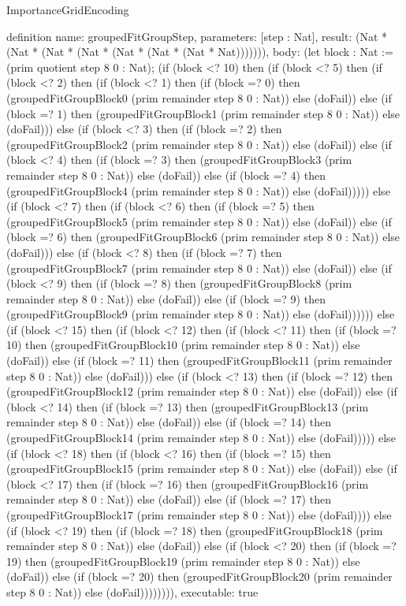 \begin{lexlean}{ImportanceGridEncoding}
\begin{semanticmodule}
definition{
  name: groupedFitGroupStep,
  parameters: [step : Nat],
  result: (Nat * (Nat * (Nat * (Nat * (Nat * (Nat * (Nat * Nat))))))),
  body: (let block : Nat := (prim quotient step 8 0 : Nat); (if (block <? 10) then
      (if (block <? 5) then
      (if (block <? 2) then
      (if (block <? 1) then
      (if (block =? 0) then (groupedFitGroupBlock0 (prim remainder step 8 0 : Nat)) else (doFail)) else
      (if (block =? 1) then (groupedFitGroupBlock1 (prim remainder step 8 0 : Nat)) else (doFail))) else
      (if (block <? 3) then
      (if (block =? 2) then (groupedFitGroupBlock2 (prim remainder step 8 0 : Nat)) else (doFail)) else
      (if (block <? 4) then
      (if (block =? 3) then (groupedFitGroupBlock3 (prim remainder step 8 0 : Nat)) else (doFail)) else
      (if (block =? 4) then (groupedFitGroupBlock4 (prim remainder step 8 0 : Nat)) else (doFail))))) else
      (if (block <? 7) then
      (if (block <? 6) then
      (if (block =? 5) then (groupedFitGroupBlock5 (prim remainder step 8 0 : Nat)) else (doFail)) else
      (if (block =? 6) then (groupedFitGroupBlock6 (prim remainder step 8 0 : Nat)) else (doFail))) else
      (if (block <? 8) then
      (if (block =? 7) then (groupedFitGroupBlock7 (prim remainder step 8 0 : Nat)) else (doFail)) else
      (if (block <? 9) then
      (if (block =? 8) then (groupedFitGroupBlock8 (prim remainder step 8 0 : Nat)) else (doFail)) else
      (if (block =? 9) then (groupedFitGroupBlock9 (prim remainder step 8 0 : Nat)) else (doFail)))))) else
      (if (block <? 15) then
      (if (block <? 12) then
      (if (block <? 11) then
      (if (block =? 10) then (groupedFitGroupBlock10 (prim remainder step 8 0 : Nat)) else (doFail)) else
      (if (block =? 11) then (groupedFitGroupBlock11 (prim remainder step 8 0 : Nat)) else (doFail))) else
      (if (block <? 13) then
      (if (block =? 12) then (groupedFitGroupBlock12 (prim remainder step 8 0 : Nat)) else (doFail)) else
      (if (block <? 14) then
      (if (block =? 13) then (groupedFitGroupBlock13 (prim remainder step 8 0 : Nat)) else (doFail)) else
      (if (block =? 14) then (groupedFitGroupBlock14 (prim remainder step 8 0 : Nat)) else (doFail))))) else
      (if (block <? 18) then
      (if (block <? 16) then
      (if (block =? 15) then (groupedFitGroupBlock15 (prim remainder step 8 0 : Nat)) else (doFail)) else
      (if (block <? 17) then
      (if (block =? 16) then (groupedFitGroupBlock16 (prim remainder step 8 0 : Nat)) else (doFail)) else
      (if (block =? 17) then (groupedFitGroupBlock17 (prim remainder step 8 0 : Nat)) else (doFail)))) else
      (if (block <? 19) then
      (if (block =? 18) then (groupedFitGroupBlock18 (prim remainder step 8 0 : Nat)) else (doFail)) else
      (if (block <? 20) then
      (if (block =? 19) then (groupedFitGroupBlock19 (prim remainder step 8 0 : Nat)) else (doFail)) else
      (if (block =? 20) then (groupedFitGroupBlock20 (prim remainder step 8 0 : Nat)) else (doFail)))))))),
  executable: true
}


\end{semanticmodule}
\end{lexlean}
